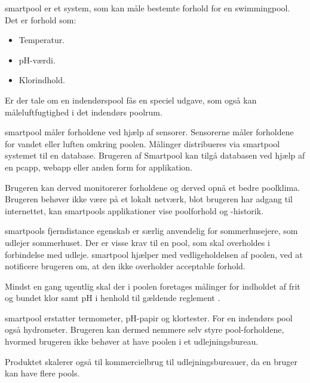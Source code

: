 \gls{smartpool} er et system, som kan måle bestemte forhold for en swimmingpool. 
Det er forhold som:

\begin{itemize}
	\item Temperatur.
	\item pH-værdi.
	\item Klorindhold.
\end{itemize}

Er der tale om en indendørspool fås en speciel udgave, som også kan måleluftfugtighed i det indendørs poolrum.

\gls{smartpool} måler forholdene ved hjælp af sensorer. Sensorerne måler forholdene for vandet eller luften omkring poolen. Målinger distribueres via \gls{smartpool} systemet til en database. Brugeren af Smartpool kan tilgå databasen ved hjælp af en \gls{pcapp}, \gls{webapp} eller anden form for applikation. 

Brugeren kan derved monitorerer forholdene og derved opnå et bedre poolklima. Brugeren behøver ikke være på et lokalt netværk, blot brugeren har adgang til internettet, kan \glspl{smartpool} applikationer vise poolforhold og -historik. 

\glspl{smartpool} fjerndistance egenskab er særlig anvendelig for sommerhusejere, som udlejer sommerhuset. Der er visse krav til en pool, som skal overholdes i forbindelse med udleje\cite{feriehusudlejernesbrancheforening2012}. \gls{smartpool} hjælper med vedligeholdelsen af poolen, ved at notificere brugeren om, at den ikke overholder acceptable forhold. 

Mindst en gang ugentlig skal der i poolen foretages målinger for indholdet af frit og bundet klor samt pH i henhold til gældende reglement \cite{feriehusudlejernesbrancheforening2012}.

\gls{smartpool} erstatter termometer, pH-papir og klortester. For en indendørs pool også hydrometer. Brugeren kan dermed nemmere selv styre pool-forholdene, hvormed brugeren ikke behøver at have poolen i et udlejningsbureau.

Produktet skalerer også til kommercielbrug til udlejningsbureauer, da en bruger kan have flere pools. 
